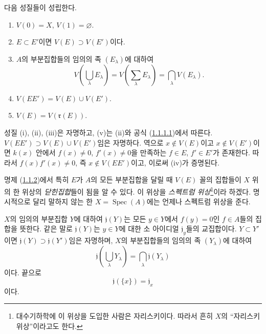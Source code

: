 \begin{proposition}[1.1.2]
\label{I.1.1.2-ko}
다음 성질들이 성립한다.
\begin{enumerate}
  \item[\rm(i)] $V(0)=X$, $V(1)=\varnothing$.
  \item[\rm(ii)] $E\subset E'$이면 $V(E)\supset V(E')$이다.
  \item[\rm(iii)] $A$의 부분집합들의 임의의 족 $(E_\lambda)$에 대하여
  \[
    V\left(\bigcup_\lambda E_\lambda\right)
      =V\left(\sum_\lambda E_\lambda\right)
      =\bigcap_\lambda V(E_\lambda).
  \]
  \item[\rm(iv)] $V(EE')=V(E)\cup V(E')$.
  \item[\rm(v)] $V(E)=V(\mathfrak{r}(E))$.
\end{enumerate}
\end{proposition}

성질 (i), (ii), (iii)은 자명하고, (v)는 (ii)와 공식
(\hyperref[I.1.1.1.1-ko]{1.1.1.1})에서 따른다.
$V(EE')\supset V(E)\cup V(E')$임은 자명하다. 역으로
$x\notin V(E)$이고 $x\notin V(E')$이면 $k(x)$ 안에서
$f(x)\neq0$, $f'(x)\neq0$을 만족하는 $f\in E$, $f'\in E'$가
존재한다. 따라서 $f(x)f'(x)\neq0$, 즉 $x\notin V(EE')$이고,
이로써 (iv)가 증명된다.

명제 (\hyperref[I.1.1.2-ko]{1.1.2})에서 특히 $E$가 $A$의 모든
부분집합을 달릴 때 $V(E)$ 꼴의 집합들이 $X$ 위의 한 위상의
\emph{닫힌집합}들이 됨을 알 수 있다. 이 위상을
\emph{스펙트럼 위상}\footnote{대수기하학에 이 위상을 도입한 사람은
자리스키이다. 따라서 흔히 $X$의 ``자리스키 위상''이라고도 한다.}이라
하겠다. 명시적으로 달리 말하지 않는 한
$X=\operatorname{Spec}(A)$에는 언제나 스펙트럼 위상을 준다.

\begin{env}[1.1.3]
\label{I.1.1.3-ko}
$X$의 임의의 부분집합 $Y$에 대하여 $\mathfrak{j}(Y)$는 모든
$y\in Y$에서 $f(y)=0$인 $f\in A$들의 집합을 뜻한다. 같은 말로
$\mathfrak{j}(Y)$는 $y\in Y$에 대한 소 아이디얼
$\mathfrak{j}_y$들의 교집합이다. $Y\subset Y'$이면
$\mathfrak{j}(Y)\supset\mathfrak{j}(Y')$임은 자명하며, $X$의
부분집합들의 임의의 족 $(Y_\lambda)$에 대하여
\begin{equation}
  \mathfrak{j}\left(\bigcup_\lambda Y_\lambda\right)
    =\bigcap_\lambda\mathfrak{j}(Y_\lambda)
  \tag{1.1.3.1}\label{I.1.1.3.1-ko}
\end{equation}
이다. 끝으로
\begin{equation}
  \mathfrak{j}(\{x\})=\mathfrak{j}_x
  \tag{1.1.3.2}\label{I.1.1.3.2-ko}
\end{equation}
이다.
\end{env}

